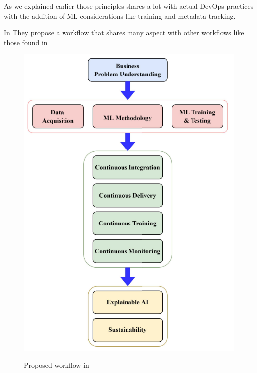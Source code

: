 As we explained earlier those principles shares a lot with actual DevOps practices with the addition of ML considerations
like training and metadata tracking.

In\cite{9792270} They propose a workflow that shares many aspect with other workflows like those found in\cite{treveil2020introducing,gift2021practical}

\begin{figure}[!htbp]
    \caption{Proposed workflow in\cite{9792270}}
    \centering
    \includegraphics[scale=0.5]{images/taxo-workflow}
    \label{fig:taxo-workflow}
\end{figure}

